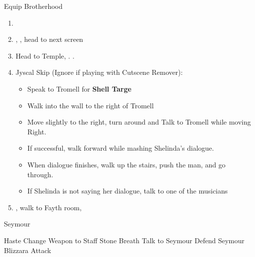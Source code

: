 \begin{equip}
	\begin{itemize}
		\tidusf Equip Brotherhood
	\end{itemize}	
\end{equip}
\begin{enumerate}[resume]
	\item 
	\item \sd, \cs[0:40], head to next screen
	\item Head to Temple, \sd. \save.
	\wincb
	\item Jyscal Skip (Ignore if playing with Cutscene Remover):
	      \begin{itemize}
		      \item Speak to Tromell for \textbf{Shell Targe}
		      \item Walk into the wall to the right of Tromell
		      \item Move slightly to the right, turn around and Talk to Tromell while moving Right.
		      \item If successful, walk forward while mashing Shelinda's dialogue.
		      \item When dialogue finishes, walk up the stairs, push the man, and go through.
		      \item If Shelinda is not saying her dialogue, talk to one of the musicians
	      \end{itemize}
	\item \sd, walk to Fayth room, \cs[2:10]
\end{enumerate}
\bothvfill
\begin{battle}[3000]{Seymour}
	\begin{itemize}
		\tidusf Haste \tidus
		\yunaf Change Weapon to Staff
		\kimahrif \od Stone Breath
		\tidusf Talk to Seymour
		\switch{\yuna}{\auron}
		\auronf Defend
		\enemyf Seymour Blizzara
		\tidusf Attack
	\end{itemize}
\end{battle}
\bothvfill
\lossvfill
